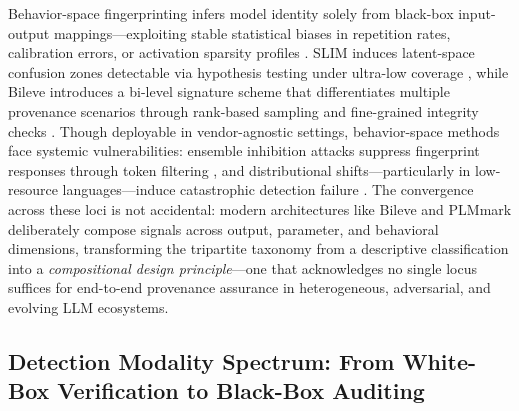 \documentclass[11pt,a4paper]{article}
\begin{document}
Behavior-space fingerprinting infers model identity solely from black-box input-output mappings---exploiting stable statistical biases in repetition rates, calibration errors, or activation sparsity profiles \cite{doi:10.1145/3292500.3330885,arxiv:2502.00706}. SLIM induces latent-space confusion zones detectable via hypothesis testing under ultra-low coverage \cite{arxiv:2601.03242}, while Bileve introduces a bi-level signature scheme that differentiates multiple provenance scenarios through rank-based sampling and fine-grained integrity checks \cite{arxiv:2406.01946}. Though deployable in vendor-agnostic settings, behavior-space methods face systemic vulnerabilities: ensemble inhibition attacks suppress fingerprint responses through token filtering \cite{arxiv:2402.16187}, and distributional shifts---particularly in low-resource languages---induce catastrophic detection failure \cite{arxiv:2402.16187}. The convergence across these loci is not accidental: modern architectures like Bileve \cite{arxiv:2406.01946} and PLMmark \cite{doi:10.1609/aaai.v37i12.26750} deliberately compose signals across output, parameter, and behavioral dimensions, transforming the tripartite taxonomy from a descriptive classification into a \emph{compositional design principle}---one that acknowledges no single locus suffices for end-to-end provenance assurance in heterogeneous, adversarial, and evolving LLM ecosystems.


\subsection{Detection Modality Spectrum: From White-Box Verification to Black-Box Auditing}
\end{document}
